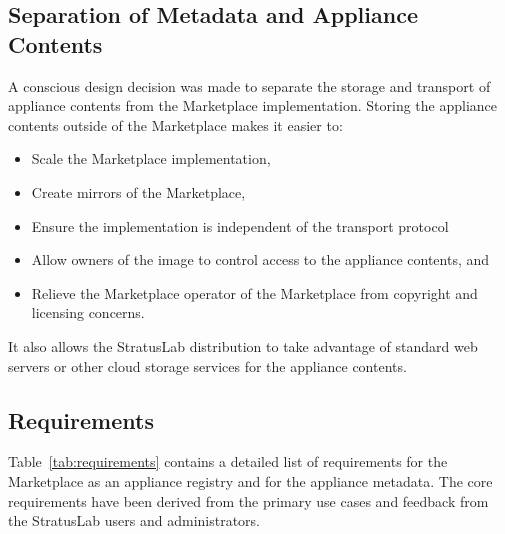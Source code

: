 \subsection{Separation of Metadata and Appliance Contents}

A conscious design decision was made to separate the storage and
transport of appliance contents from the Marketplace implementation.
Storing the appliance contents outside of the Marketplace makes it
easier to:
\begin{itemize}
\item Scale the Marketplace implementation,
\item Create mirrors of the Marketplace,
\item Ensure the implementation is independent of the transport
  protocol
\item Allow owners of the image to control access to the appliance
  contents, and
\item Relieve the Marketplace operator of the Marketplace from
  copyright and licensing concerns.
\end{itemize}
It also allows the StratusLab distribution to take advantage of
standard web servers or other cloud storage services for the appliance
contents.

\subsection{Requirements}

Table~\ref{tab:requirements} contains a detailed list of requirements
for the Marketplace as an appliance registry and for the appliance
metadata.  The core requirements have been derived from the primary
use cases and feedback from the StratusLab users and administrators.

